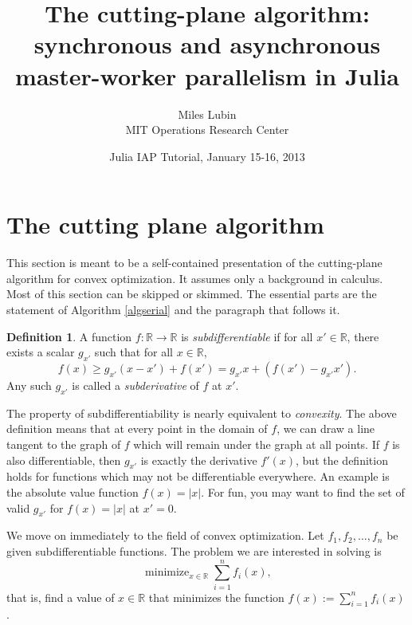 \documentclass[12pt]{article}
\title{The cutting-plane algorithm: synchronous and asynchronous master-worker parallelism in Julia}
\author{Miles Lubin\\MIT Operations Research Center}
\date{Julia IAP Tutorial, January 15-16, 2013}
\theoremstyle{definition}
\newtheorem*{defn}{Definition}
\begin{document}
\maketitle

\section{The cutting plane algorithm}
This section is meant to be a self-contained presentation of the cutting-plane algorithm for convex optimization. It assumes only a background in calculus. Most of this section can be skipped or skimmed. The essential parts are the statement of Algorithm \ref{algserial} and the paragraph that follows it.\nocite{HiriartLemarechal93book2}

\begin{defn}
A function $f : \mathbb{R} \to \mathbb{R}$ is \textit{subdifferentiable} if for all $x' \in \mathbb{R}$, there exists a scalar $g_{x'}$ such that for all $x \in \mathbb{R}$, 
\[
f(x) \ge g_{x'}(x-x') + f(x') = g_{x'}x + (f(x')-g_{x'}x').
\]
Any such $g_{x'}$ is called a \textit{subderivative} of $f$ at $x'$.
\end{defn}
The property of subdifferentiability is nearly equivalent to \textit{convexity}. The above definition means that at every point in the domain of $f$, we can draw a line tangent to the graph of $f$ which will remain under the graph at all points.   If $f$ is also differentiable, then $g_{x'}$ is exactly the derivative $f'(x)$, but the definition holds for functions which may not be differentiable everywhere. An example is the absolute value function $f(x) = |x|$. For fun, you may want to find the set of valid $g_{x'}$ for $f(x) = |x|$ at $x' = 0$.

We move on immediately to the field of convex optimization. Let $f_1,f_2,\ldots,f_n$ be given subdifferentiable functions. The problem we are interested in solving is
\begin{equation}
\operatorname{minimize}_{x \in \mathbb{R}} \sum_{i=1}^n f_i(x),
\end{equation}
that is, find a value of $x \in \mathbb{R}$ that minimizes the function $f(x) := \sum_{i=1}^n f_i(x)$.
\end{document}
